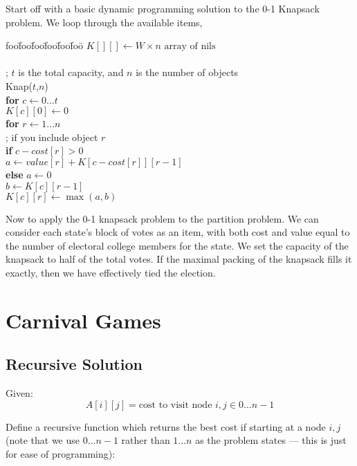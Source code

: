 \documentclass[12pt]{article}
\newenvironment{alg}{
\begin{tabbing}
foo\=foo\=foo\=foo\=foo\=foo\= \kill}
{\end{tabbing}}
\begin{document}
Start off with a basic dynamic programming solution to the 0-1 Knapsack
problem.  We loop through the available items, 

\begin{alg}
$K[][] \leftarrow W \times n \mbox{ array of nils}$ \\
\\
; $t$ is the total capacity, and $n$ is the number of objects \\
{\sc Knap}($t$,$n$) \\
\> {\bf for} $c \leftarrow 0 \dots t$ \\
\> \> $K[c][0] \leftarrow 0$ \\
\> \> {\bf for} $r \leftarrow 1 \dots n$ \\
\> \> \> ; if you include object $r$ \\
\> \> \> {\bf if} $c - cost[r] > 0$ \\
\> \> \> \> $a \leftarrow value[r] + K[c-cost[r]][r-1]$ \\
\> \> \> {\bf else} $a \leftarrow 0$ \\
\> \> \> $b \leftarrow K[c][r-1]$ \\
\> \> \> $K[c][r] \leftarrow \max (a,b)$ 
\end{alg}

Now to apply the 0-1 knapsack problem to the partition problem.  We can
consider each state's block of votes as an item, with both cost and value
equal to the number of electoral college members for the state.  We
set the capacity of the knapsack to half of the total votes.  If the
maximal packing of the knapsack fills it exactly, then we have effectively
tied the election.  

\section{Carnival Games}
\subsection{Recursive Solution}
Given:
\[
 A[i][j] = \mbox{cost to visit node $i,j \in 0 \dots n-1$}
\]

Define a recursive function which returns the best cost if starting at a
node $i,j$ (note that we use $0\dots n-1$ rather than $1\dots n$ as the
problem states --- this is just for ease of programming):
\end{document}
